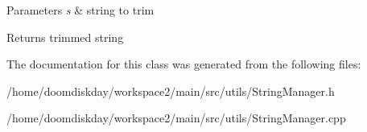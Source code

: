\begin{DoxyParams}{Parameters}
{\em s} & string to trim \\
\hline
\end{DoxyParams}
\begin{DoxyReturn}{Returns}
trimmed string 
\end{DoxyReturn}


The documentation for this class was generated from the following files\+:\begin{DoxyCompactItemize}
\item 
/home/doomdiskday/workspace2/main/src/utils/String\+Manager.\+h\item 
/home/doomdiskday/workspace2/main/src/utils/String\+Manager.\+cpp\end{DoxyCompactItemize}
